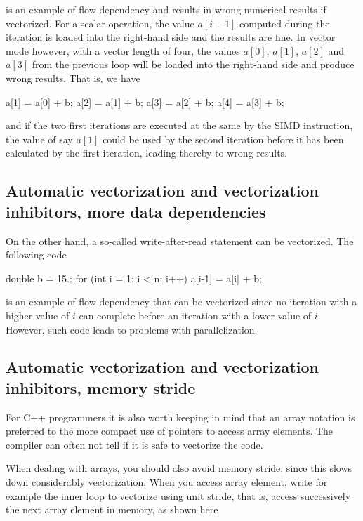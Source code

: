 \documentclass[%
oneside,                 %
final,                   %
10pt]{article}
\begin{document}
\ecppcod

is an example of flow dependency and results in wrong numerical results if vectorized. For a scalar operation, the value $a[i-1]$ computed during the iteration is loaded into the right-hand side and the results are fine. In vector mode however, with a vector length of four, the values $a[0]$, $a[1]$, $a[2]$ and $a[3]$ from the previous loop will be loaded into the right-hand side and produce wrong results. That is, we have





\bcppcod
   a[1] = a[0] + b;
   a[2] = a[1] + b;
   a[3] = a[2] + b;
   a[4] = a[3] + b;

\ecppcod

and if the two first iterations are  executed at the same by the SIMD instruction, the value of say $a[1]$ could be used by the second iteration before it has been calculated by the first iteration, leading thereby to wrong results.

\subsection{Automatic vectorization and vectorization inhibitors, more data dependencies}

On the other hand,  a so-called 
write-after-read statement can be vectorized. The following code





\bcppcod
  double b = 15.;
  for (int i = 1; i < n; i++) {
      a[i-1] = a[i] + b;
  }

\ecppcod

is an example of flow dependency that can be vectorized since no iteration with a higher value of $i$
can complete before an iteration with a lower value of $i$. However, such code leads to problems with parallelization.

\subsection{Automatic vectorization and vectorization inhibitors, memory stride}

For C++ programmers  it is also worth keeping in mind that an array notation is preferred to the more compact use of pointers to access array elements. The compiler can often not tell if it is safe to vectorize the code. 

When dealing with arrays, you should also avoid memory stride, since this slows down considerably vectorization. When you access array element, write for example the inner loop to vectorize using unit stride, that is, access successively the next array element in memory, as shown here
\end{document}
